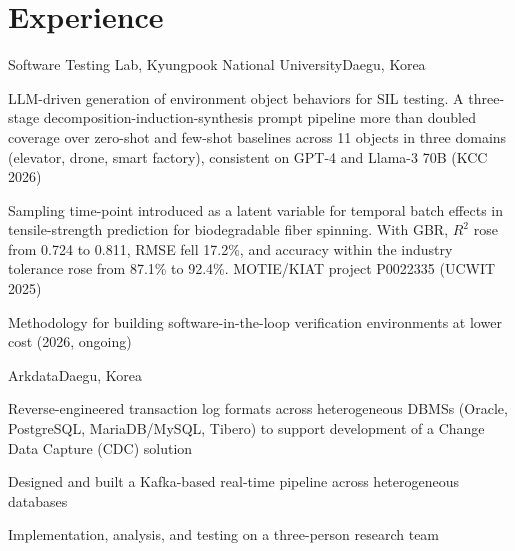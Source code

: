 \documentclass[small]{cv}
\begin{document}
\section{Experience}
  {Software Testing Lab, Kyungpook National University}{Daegu, Korea}
  {\begin{cvitems}
     \item LLM-driven generation of environment object behaviors for SIL testing. A
           three-stage decomposition-induction-synthesis prompt pipeline more than doubled
           coverage over zero-shot and few-shot baselines across 11 objects in three
           domains (elevator, drone, smart factory), consistent on GPT-4 and
           Llama-3 70B (KCC 2026)
     \item Sampling time-point introduced as a latent variable for temporal batch effects
           in tensile-strength prediction for biodegradable fiber spinning. With GBR,
           $R^2$ rose from 0.724 to 0.811, RMSE fell 17.2\%, and accuracy within the
           industry tolerance rose from 87.1\% to 92.4\%.
           MOTIE/KIAT project P0022335 (UCWIT 2025)
     \item Methodology for building software-in-the-loop verification environments
           at lower cost (2026, ongoing)
   \end{cvitems}}

  {Arkdata}{Daegu, Korea}
  {\begin{cvitems}
     \item Reverse-engineered transaction log formats across heterogeneous DBMSs
           (Oracle, PostgreSQL, MariaDB/MySQL, Tibero) to support development of a
           Change Data Capture (CDC) solution
     \item Designed and built a Kafka-based real-time pipeline across heterogeneous
           databases
     \item Implementation, analysis, and testing on a three-person research team
   \end{cvitems}}

\end{document}
